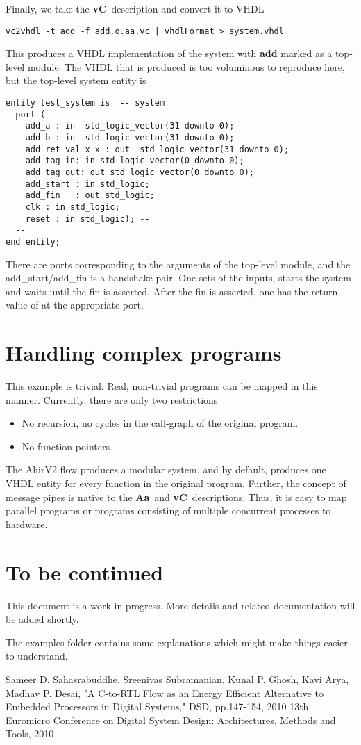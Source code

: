 \documentclass{article}
\newcommand{\Aa}{{\bf Aa}~}
\newcommand{\vC}{{\bf vC}~}
\begin{document}
Finally, we take the \vC description and convert it to
VHDL
\begin{verbatim}
vc2vhdl -t add -f add.o.aa.vc | vhdlFormat > system.vhdl
\end{verbatim}
This produces a VHDL implementation of the system with
{\bf add} marked as a top-level module.  The VHDL that
is produced is too voluminous to reproduce here, but
the top-level system entity is
\begin{verbatim}
entity test_system is  -- system
  port (--
    add_a : in  std_logic_vector(31 downto 0);
    add_b : in  std_logic_vector(31 downto 0);
    add_ret_val_x_x : out  std_logic_vector(31 downto 0);
    add_tag_in: in std_logic_vector(0 downto 0);
    add_tag_out: out std_logic_vector(0 downto 0);
    add_start : in std_logic;
    add_fin   : out std_logic;
    clk : in std_logic;
    reset : in std_logic); --
  --
end entity;
\end{verbatim}
There are ports corresponding to the arguments of the top-level module,
and the add\_start/add\_fin is a handshake pair.  One sets of the inputs,
starts the system and waits until the fin is asserted.  After the fin
is asserted, one has the return value of at the appropriate port.

\section{Handling complex programs}

This example is trivial.  Real, non-trivial programs can be
mapped in this manner.  Currently, there are only
two restrictions
\begin{itemize}
\item No recursion, no cycles in the call-graph of the original
program.
\item No function pointers.
\end{itemize}

The AhirV2 flow produces a modular system, and by default,
produces one VHDL entity for every function in the original
program.  Further, the concept of message pipes is native
to the \Aa and \vC descriptions.  Thus, it is easy to
map parallel programs or programs consisting of multiple
concurrent processes to hardware.

\section{To be continued}

This document is a work-in-progress.  More details and
related documentation will be added shortly.

The examples folder contains some explanations which might
make things easier to understand.

\begin{thebibliography}{99}
Sameer D. Sahasrabuddhe, Sreenivas Subramanian, Kunal P. Ghosh, Kavi Arya, Madhav P. Desai, 
"A C-to-RTL Flow as an Energy Efficient Alternative to Embedded Processors in Digital Systems," 
DSD, pp.147-154, 2010 13th Euromicro Conference on Digital 
System Design: Architectures, Methods and Tools, 2010
\end{thebibliography}
\end{document}
